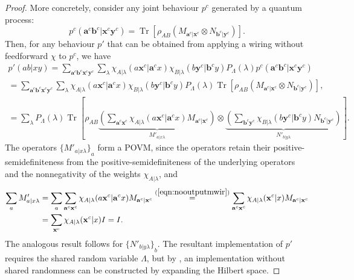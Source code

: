 \documentclass[10pt, a4paper]{article}
\numberwithin{equation}{section} %
\theoremstyle{definition}
\theoremstyle{plain}
\newcommand{\?}{\mathrel{?}} %
\newcommand{\cvec}[1]{\boldsymbol{\mathbf{#1}}}    %
\newcommand{\Tr}[2][]{\mathop{\mathrm{Tr}#1}\left[ #2 \right]} %
\begin{document}
\begin{proof}
              More concretely, consider any joint behaviour \(p^c\) generated by a quantum process:
              \begin{equation}
                p^c(\cvec{a}^c\cvec{b}^c|\cvec{x}^c\cvec{y}^c) = \Tr{\rho_{AB} \left( M_{\cvec{a}^c|\cvec{x}^c} \otimes N_{\cvec{b}^c|\cvec{y}^c} \right) }.
              \end{equation}
              Then, for any behaviour \(p'\) that can be obtained from applying a wiring without feedforward \(\chi\) to \(p^c\), we have
              \begin{gather}
                p'(ab|xy) = \sum_{\cvec{a}^c\cvec{b}^c\cvec{x}^c\cvec{y}^c} \sum_{\lambda} \chi_{A|\lambda}(a\cvec{x}^c|\cvec{a}^cx) \chi_{B|\lambda}(b\cvec{y}^c|\cvec{b}^cy) P_{\Lambda}(\lambda) p^c(\cvec{a}^c\cvec{b}^c|\cvec{x}^c\cvec{y}^c) \\
                = \sum_{\cvec{a}^c\cvec{b}^c\cvec{x}^c\cvec{y}^c} \sum_{\lambda} \chi_{A|\lambda}(a\cvec{x}^c|\cvec{a}^cx) \chi_{B|\lambda}(b\cvec{y}^c|\cvec{b}^cy) P_{\Lambda}(\lambda) \Tr{\rho_{AB} \left( M_{\cvec{a}^c|\cvec{x}^c} \otimes N_{\cvec{b}^c|\cvec{y}^c} \right) }, \\
                = \sum_{\lambda} P_{\Lambda}(\lambda) \Tr{\rho_{AB} \underbrace{\left( \sum_{\cvec{a}^c\cvec{x}^c} \chi_{A|\lambda}(a\cvec{x}^c|\cvec{a}^cx) M_{\cvec{a}^c|\cvec{x}^c} \right)}_{M'_{a|x\lambda}} \otimes \underbrace{\left(\sum_{\cvec{b}^c\cvec{y}^c} \chi_{B|\lambda}(b\cvec{y}^c|\cvec{b}^cy) N_{\cvec{b}^c|\cvec{y}^c} \right)}_{N'_{b|y\lambda}} }.
              \end{gather}
              The operators \({\{M'_{a|x\lambda}\}}_a\) form a POVM, since the operators retain their positive-semidefiniteness from the positive-semidefiniteness of the underlying operators and the nonnegativity of the weights \(\chi_{A|\lambda}\), and
              \begin{align}
                \sum_a M'_{a|x\lambda} &= \sum_a \sum_{\cvec{a}^c\cvec{x}^c} \chi_{A|\lambda}(a\cvec{x}^c|\cvec{a}^cx) M_{\cvec{a}^c|\cvec{x}^c} \stackrel{(\ref{eqn:nooutputmwir})}{=} \sum_{\cvec{a}^c\cvec{x}^c} \chi_{A|\lambda}(\cvec{x}^c|x) M_{\cvec{a}^c|\cvec{x}^c} \\
                                       &= \sum_{\cvec{x}^c} \chi_{A|\lambda}(\cvec{x}^c|x) I = I.
              \end{align}
               The analogous result follows for \({\{N'_{b|y\lambda}\}}_b\). The resultant implementation of \(p'\) requires the shared random variable \(\Lambda\), but by , an implementation without shared randomness can be constructed by expanding the Hilbert space.


\end{proof}
\end{document}
